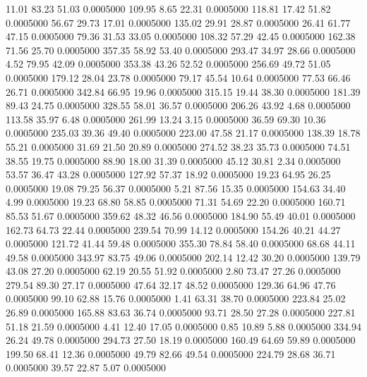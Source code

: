   11.01   83.23   51.03   0.0005000
 109.95    8.65   22.31   0.0005000
 118.81   17.42   51.82   0.0005000
  56.67   29.73   17.01   0.0005000
 135.02   29.91   28.87   0.0005000
  26.41   61.77   47.15   0.0005000
  79.36   31.53   33.05   0.0005000
 108.32   57.29   42.45   0.0005000
 162.38   71.56   25.70   0.0005000
 357.35   58.92   53.40   0.0005000
 293.47   34.97   28.66   0.0005000
   4.52   79.95   42.09   0.0005000
 353.38   43.26   52.52   0.0005000
 256.69   49.72   51.05   0.0005000
 179.12   28.04   23.78   0.0005000
  79.17   45.54   10.64   0.0005000
  77.53   66.46   26.71   0.0005000
 342.84   66.95   19.96   0.0005000
 315.15   19.44   38.30   0.0005000
 181.39   89.43   24.75   0.0005000
 328.55   58.01   36.57   0.0005000
 206.26   43.92    4.68   0.0005000
 113.58   35.97    6.48   0.0005000
 261.99   13.24    3.15   0.0005000
  36.59   69.30   10.36   0.0005000
 235.03   39.36   49.40   0.0005000
 223.00   47.58   21.17   0.0005000
 138.39   18.78   55.21   0.0005000
  31.69   21.50   20.89   0.0005000
 274.52   38.23   35.73   0.0005000
  74.51   38.55   19.75   0.0005000
  88.90   18.00   31.39   0.0005000
  45.12   30.81    2.34   0.0005000
  53.57   36.47   43.28   0.0005000
 127.92   57.37   18.92   0.0005000
  19.23   64.95   26.25   0.0005000
  19.08   79.25   56.37   0.0005000
   5.21   87.56   15.35   0.0005000
 154.63   34.40    4.99   0.0005000
  19.23   68.80   58.85   0.0005000
  71.31   54.69   22.20   0.0005000
 160.71   85.53   51.67   0.0005000
 359.62   48.32   46.56   0.0005000
 184.90   55.49   40.01   0.0005000
 162.73   64.73   22.44   0.0005000
 239.54   70.99   14.12   0.0005000
 154.26   40.21   44.27   0.0005000
 121.72   41.44   59.48   0.0005000
 355.30   78.84   58.40   0.0005000
  68.68   44.11   49.58   0.0005000
 343.97   83.75   49.06   0.0005000
 202.14   12.42   30.20   0.0005000
 139.79   43.08   27.20   0.0005000
  62.19   20.55   51.92   0.0005000
   2.80   73.47   27.26   0.0005000
 279.54   89.30   27.17   0.0005000
  47.64   32.17   48.52   0.0005000
 129.36   64.96   47.76   0.0005000
  99.10   62.88   15.76   0.0005000
   1.41   63.31   38.70   0.0005000
 223.84   25.02   26.89   0.0005000
 165.88   83.63   36.74   0.0005000
  93.71   28.50   27.28   0.0005000
 227.81   51.18   21.59   0.0005000
   4.41   12.40   17.05   0.0005000
   0.85   10.89    5.88   0.0005000
 334.94   26.24   49.78   0.0005000
 294.73   27.50   18.19   0.0005000
 160.49   64.69   59.89   0.0005000
 199.50   68.41   12.36   0.0005000
  49.79   82.66   49.54   0.0005000
 224.79   28.68   36.71   0.0005000
  39.57   22.87    5.07   0.0005000
